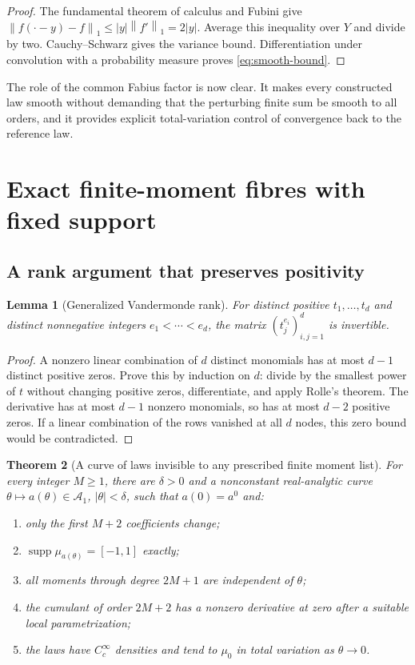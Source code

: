 \documentclass[11pt,a4paper]{article}
\newtheorem{theorem}{Theorem}[section]
\newtheorem{lemma}[theorem]{Lemma}
\theoremstyle{definition}
\theoremstyle{remark}
\DeclareMathOperator{\supp}{supp}
\newcommand{\A}{\mathcal A}
\newcommand{\norm}[1]{\left\lVert #1\right\rVert}
\begin{document}
\begin{proof}
The fundamental theorem of calculus and Fubini give
$\norm{f(\cdot-y)-f}_1\le |y|\norm{f'}_1=2|y|$.
Average this inequality over $Y$ and divide by two. Cauchy--Schwarz gives
the variance bound. Differentiation under convolution with a probability
measure proves \eqref{eq:smooth-bound}.
\end{proof}

The role of the common Fabius factor is now clear. It makes every
constructed law smooth without demanding that the perturbing finite sum
be smooth to all orders, and it provides explicit total-variation control
of convergence back to the reference law.

\section{Exact finite-moment fibres with fixed support}
\label{sec:fibres}

\subsection{A rank argument that preserves positivity}

\begin{lemma}[Generalized Vandermonde rank]\label{lem:vander}
For distinct positive $t_1,\ldots,t_d$ and distinct nonnegative integers
$e_1<\cdots<e_d$, the matrix $(t_j^{e_i})_{i,j=1}^d$ is invertible.
\end{lemma}

\begin{proof}
A nonzero linear combination of $d$ distinct monomials has at most $d-1$
distinct positive zeros. Prove this by induction on $d$: divide by the
smallest power of $t$ without changing positive zeros, differentiate, and
apply Rolle's theorem. The derivative has at most $d-1$ nonzero monomials,
so has at most $d-2$ positive zeros. If a linear combination of the rows
vanished at all $d$ nodes, this zero bound would be contradicted.
\end{proof}

\begin{theorem}[A curve of laws invisible to any prescribed finite moment list]
\label{thm:fibres}
For every integer $M\ge1$, there are $\delta>0$ and a nonconstant
real-analytic curve $\theta\mapsto a(\theta)\in\A_1$, $|\theta|<\delta$,
such that $a(0)=a^0$ and:
\begin{enumerate}[label=(\roman*)]
\item only the first $M+2$ coefficients change;
\item $\supp\mu_{a(\theta)}=[-1,1]$ exactly;
\item all moments through degree $2M+1$ are independent of $\theta$;
\item the cumulant of order $2M+2$ has a nonzero derivative at zero after
      a suitable local parametrization;
\item the laws have $C_c^\infty$ densities and tend to $\mu_0$ in total
      variation as $\theta\to0$.
\end{enumerate}
\end{theorem}
\end{document}
